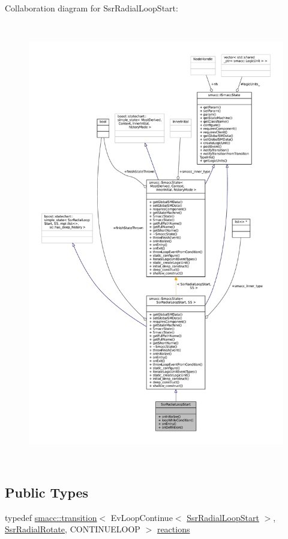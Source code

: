 Collaboration diagram for Ssr\+Radial\+Loop\+Start\+:
\nopagebreak
\begin{figure}[H]
\begin{center}
\leavevmode
\includegraphics[height=550pt]{structSsrRadialLoopStart__coll__graph}
\end{center}
\end{figure}
\subsection*{Public Types}
\begin{DoxyCompactItemize}
\item 
typedef \hyperlink{classsmacc_1_1transition}{smacc\+::transition}$<$ Ev\+Loop\+Continue$<$ \hyperlink{structSsrRadialLoopStart}{Ssr\+Radial\+Loop\+Start} $>$, \hyperlink{structSsrRadialRotate}{Ssr\+Radial\+Rotate}, C\+O\+N\+T\+I\+N\+U\+E\+L\+O\+OP $>$ \hyperlink{structSsrRadialLoopStart_a182ebeeec9ed788811d32ad023e13269}{reactions}
\end{DoxyCompactItemize}
